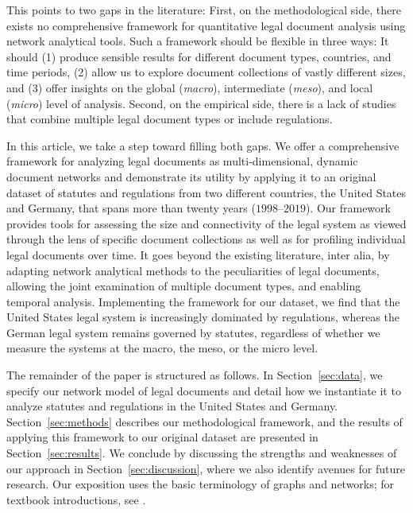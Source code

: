 This points to two gaps in the literature: 
First, on the methodological side, there exists no comprehensive framework for quantitative legal document analysis using network analytical tools.
Such a framework should be flexible in three ways:
It should (1) produce sensible results for different document types, countries, and time periods, 
(2) allow us to explore document collections of vastly different sizes, 
and (3) offer insights on the global (\emph{macro}), intermediate (\emph{meso}), and local (\emph{micro}) level of analysis. 
Second, on the empirical side, there is a lack of studies that combine multiple legal document types or include regulations.

In this article, we take a step toward filling both gaps.
We offer a comprehensive framework for analyzing legal documents as multi-dimensional, dynamic document networks 
and demonstrate its utility by applying it to an original dataset of statutes and regulations from two different countries, the United States and Germany, that spans more than twenty years ($1998$--$2019$).
Our framework provides tools for assessing the size and connectivity of the legal system as viewed through the lens of specific document collections as well as for profiling individual legal documents over time. 
It goes beyond the existing literature, inter alia, by adapting network analytical methods to the peculiarities of legal documents, allowing the joint examination of multiple document types, and enabling temporal analysis.
Implementing the framework for our dataset, we find that the United States legal system is increasingly dominated by regulations, 
whereas the German legal system remains governed by statutes, 
regardless of whether we measure the systems at the macro, the meso, or the micro level.

The remainder of the paper is structured as follows.
In Section~\ref{sec:data}, we specify our network model of legal documents and detail how we instantiate it to analyze statutes and regulations in the United States and Germany.
Section~\ref{sec:methods} describes our methodological framework,
and the results of applying this framework to our original dataset are presented in Section~\ref{sec:results}.
We conclude by discussing the strengths and weaknesses of our approach in Section~\ref{sec:discussion}, where we also identify avenues for future research. 
Our exposition uses the basic terminology of graphs and networks; for textbook introductions, see \cite{easley2010,barabasi2016,newman2018}.
